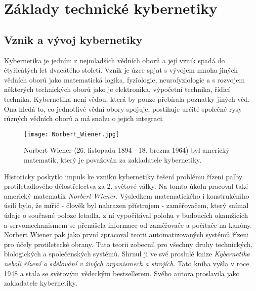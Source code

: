 \setchaptertoc
\chapter{Základy technické kybernetiky}

  \section{Vznik a vývoj kybernetiky}
    Kybernetika je jedním z nejmladších vědních oborů a její vznik spadá do čtyřicátých let 
    dvacátého století. Vznik je úzce spjat s vývojem mnoha jiných vědních oborů jako matematická 
    logika, fyziologie, neurofyziologie a s rozvojem některých technických oborů jako je 
    elektronika, výpočetní technika, řídicí technika. Kybernetika není vědou, která by pouze 
    přebírala poznatky jiných věd. Ona hledá to, co jednotlivé vědní obory spojuje, postihuje 
    určité společné rysy různých vědních oborů a má snahu o jejich integraci. 

    \begin{figure}[ht!]
      \centering
      \texttt{[image: Norbert\_Wiener.jpg]}
      \caption{Norbert Wiener (26. listopadu 1894 - 18. brezna 1964) byl americký matematik, který 
               je považován za zakladatele kybernetiky. }
      \label{tky:fig003}
    \end{figure}
  
    Historicky poskytlo impuls ke vzniku kybernetiky řešení problému řízeni palby protiletadlového 
    dělostřelectva za 2. světové války. Na tomto úkolu pracoval také americký matematik 
    \emph{Norbert Wiener}. Výsledkem matematického i konstrukčního úsilí bylo, že mířič - člověk 
    byl nahrazen přístrojem - zaměřovačem, který snímal údaje o současné poloze letadla, z ní 
    vypočítával polohu v budoucích okamžicích a servomechanismem se přenášela informace od 
    zaměřovače a počítače na kanóny. Norbert Wiener pak jako první zpracoval teorii 
    automatizovaných systémů řízeni pro účely protiletecké obrany. Tuto teorii zobecnil pro všechny 
    druhy technických, biologických a společenských systémů. Shrnul ji ve své proslulé knize 
    \emph{Kybernetika neboli řízení a sdělování v živých organismech a strojích}. Tato kniha vyšla 
    v roce \num{1948} a stala se světovým vědeckým bestsellerem. Svého autora proslavila jako 
    zakladatele kybernetiky.
    
